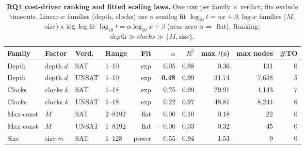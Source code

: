 \begin{table}[t]\centering
\caption{\textbf{RQ1 cost-driver ranking and fitted scaling laws.} One row per family $\times$ verdict; fits exclude timeouts. Linear-$x$ families (depth, clocks) use a semilog fit $\log_{10}t=\alpha x+\beta$, log-$x$ families ($M$, size) a log--log fit $\log_{10}t=\alpha\log_{10}x+\beta$ (near-zero $\alpha\Rightarrow$ flat). Ranking: $\textit{depth}\gg\textit{clocks}\gg\{M,\text{size}\}$.}\label{tab:perf-rq1}
\small\setlength{\tabcolsep}{4pt}
\begin{tabular}{llllrrrrrr}
\toprule
Family & Factor & Verd. & Range & Fit & $\alpha$ & $R^2$ & max $t$(s) & max nodes & \#TO \\
\midrule
Depth & depth $d$ & SAT & 1--10 & exp & 0.05 & 0.98 & 0.36 & 131 & 0 \\
Depth & depth $d$ & UNSAT & 1--10 & exp & \textbf{0.48} & 0.99 & 31.74 & 7{,}638 & 5 \\
Clocks & clocks $k$ & SAT & 1--18 & exp & 0.25 & 0.99 & 29.91 & 4{,}143 & 7 \\
Clocks & clocks $k$ & UNSAT & 1--18 & exp & 0.22 & 0.97 & 48.81 & 8{,}244 & 6 \\
Max-const & $M$ & SAT & 2--8192 & flat & 0.00 & 0.10 & 0.18 & 22 & 0 \\
Max-const & $M$ & UNSAT & 1--8192 & flat & $-0.00$ & 0.03 & 0.32 & 45 & 0 \\
Size & size $m$ & SAT & 1--128 & power & 0.55 & 0.94 & 1.53 & 9 & 0 \\
\bottomrule
\end{tabular}
\end{table}
